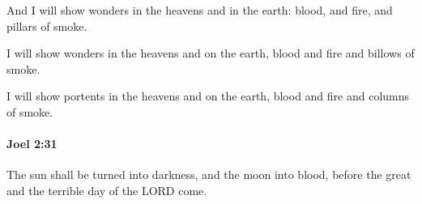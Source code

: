 			\begin{versebox}
					\item[BHS] 
					\item[LXX] 
					\item[ASV] And I will show wonders in the heavens and in the earth: blood, and fire, and pillars of smoke.
					\item[NIV] I will show wonders in the heavens and on the earth, blood and fire and billows of smoke.
					\item[NRSV] I will show portents in the heavens and on the earth, blood and fire and columns of smoke.
			\end{versebox}

		\paragraph{Joel 2:31} %
			\label{JOEL-2-31}

			The sun shall be turned into darkness, and the moon into blood, before the great and the terrible day of the LORD come.

